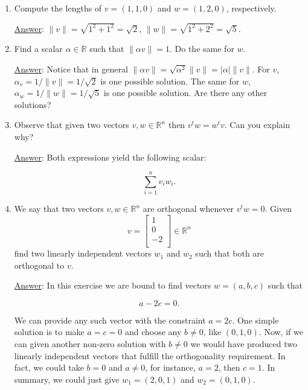 \documentclass[]{book}
\theoremstyle{definition}
\newcommand{\bb}[1]{\mathbb{#1}}
\newcommand{\R}{\bb{R}}
\newcommand\ans{\underline{Answer}: }
\begin{document}
\begin{enumerate}
\begin{enumerate}
\item Compute the lengths of $v=(1,1,0)$ and $w=(1,2,0)$, respectively.

\ans $\| v \| = \sqrt{1^2 + 1^2} = \sqrt{2}$,  $\| w \| = \sqrt{1^2 + 2^2} = \sqrt{5}$.

\item Find a scalar $\alpha\in\R$ such that $\| \alpha v\| = 1$. Do the same for $w$.

\ans Notice that in general $\|\alpha v\| = \sqrt{\alpha^2} \|v\| = |\alpha| \|v\|$. 
For $v$, $\alpha_v = 1 / \| v \| = 1 / \sqrt{2}$ is one possible solution.
The same for $w$, $\alpha_w=1/\|w\| = 1/\sqrt{5}$ is one possible solution.
Are there any other solutions?

\item Observe that given two vectors $v, w \in \R^n$ then $v^tw=w^tv$. Can you explain why?

\ans Both expressions yield the following scalar:

\[
\sum_{i=1}^n v_i w_i.
\]

\item We say that two vectors $v, w \in \R^n$ are orthogonal whenever $v^tw=0$. 
Given
\[
v =  \left[ {\begin{array}{c}
1 \\
0 \\
-2 \\
\end{array} } \right]\in\R^n
\]
find two linearly independent vectors $w_1$ and $w_2$ such that both are orthogonal to $v$.

\ans In this exercise we are bound to find vectors $w=(a, b, c)$ such that

\[
a - 2 c = 0.
\]

We can provide any such vector with the constraint $a = 2c$. One simple solution is to make $a=c=0$ and choose any $b\neq 0$, like $(0,1,0)$.
Now, if we can given another non-zero solution with  $b\neq 0$ we would have produced two linearly independent vectors that fulfill the 
orthogonality requirement. In fact, we could take $b=0$ and $a \neq 0$, for instance, $a=2$, then $c = 1$. In summary, we could just give
$w_1 = (2, 0, 1)$ and $w_2 = (0, 1, 0)$. 

\end{enumerate}




\end{enumerate}
\end{document}
